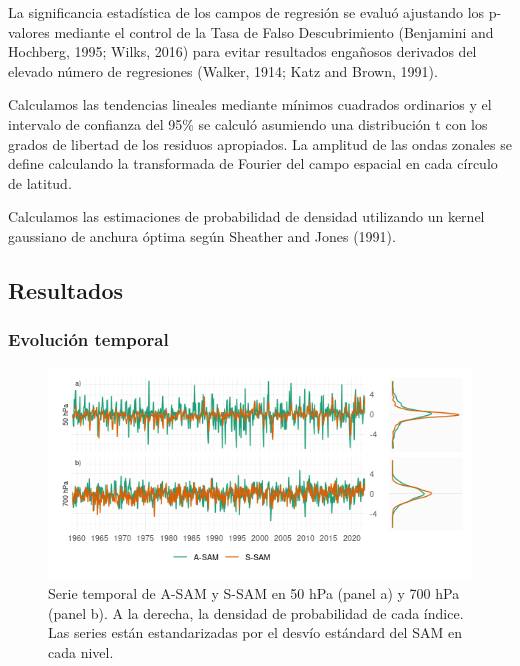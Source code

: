 \documentclass[12pt,oneside]{reedthesis}
\begin{document}
La significancia estadística de los campos de regresión se evaluó ajustando los p-valores mediante el control de la Tasa de Falso Descubrimiento (Benjamini and Hochberg, 1995; Wilks, 2016) para evitar resultados engañosos derivados del elevado número de regresiones (Walker, 1914; Katz and Brown, 1991).

Calculamos las tendencias lineales mediante mínimos cuadrados ordinarios y el intervalo de confianza del 95\% se calculó asumiendo una distribución t con los grados de libertad de los residuos apropiados.
La amplitud de las ondas zonales se define calculando la transformada de Fourier del campo espacial en cada círculo de latitud.

Calculamos las estimaciones de probabilidad de densidad utilizando un kernel gaussiano de anchura óptima según Sheather and Jones (1991).

\hypertarget{resultados}{%
\subsection{Resultados}\label{resultados}}

\hypertarget{temporal}{%
\subsubsection{Evolución temporal}\label{temporal}}





\begin{figure}
\includegraphics{figures/30-sam/asymsam-timeseries-1} \caption{Serie temporal de A-SAM y S-SAM en 50 hPa (panel a) y 700 hPa (panel b).
A la derecha, la densidad de probabilidad de cada índice.
Las series están estandarizadas por el desvío estándard del SAM en cada nivel.}\label{fig:asymsam-timeseries}
\end{figure}
\end{document}
